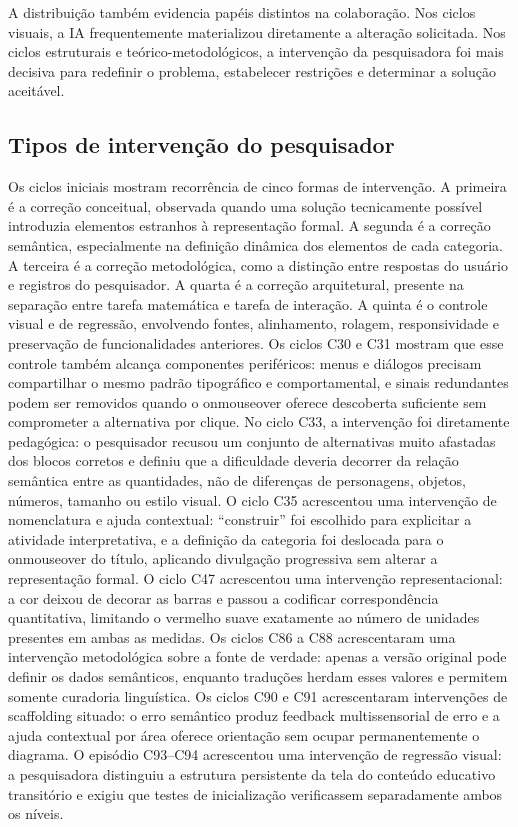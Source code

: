 \documentclass[preprint,12pt,authoryear]{elsarticle}
\begin{document}
A distribuição também evidencia papéis distintos na colaboração. Nos ciclos visuais, a IA frequentemente materializou diretamente a alteração solicitada. Nos ciclos estruturais e teórico-metodológicos, a intervenção da pesquisadora foi mais decisiva para redefinir o problema, estabelecer restrições e determinar a solução aceitável.

\subsection{Tipos de intervenção do pesquisador}
Os ciclos iniciais mostram recorrência de cinco formas de intervenção. A primeira é a correção conceitual, observada quando uma solução tecnicamente possível introduzia elementos estranhos à representação formal. A segunda é a correção semântica, especialmente na definição dinâmica dos elementos de cada categoria. A terceira é a correção metodológica, como a distinção entre respostas do usuário e registros do pesquisador. A quarta é a correção arquitetural, presente na separação entre tarefa matemática e tarefa de interação. A quinta é o controle visual e de regressão, envolvendo fontes, alinhamento, rolagem, responsividade e preservação de funcionalidades anteriores. Os ciclos C30 e C31 mostram que esse controle também alcança componentes periféricos: menus e diálogos precisam compartilhar o mesmo padrão tipográfico e comportamental, e sinais redundantes podem ser removidos quando o onmouseover oferece descoberta suficiente sem comprometer a alternativa por clique. No ciclo C33, a intervenção foi diretamente pedagógica: o pesquisador recusou um conjunto de alternativas muito afastadas dos blocos corretos e definiu que a dificuldade deveria decorrer da relação semântica entre as quantidades, não de diferenças de personagens, objetos, números, tamanho ou estilo visual. O ciclo C35 acrescentou uma intervenção de nomenclatura e ajuda contextual: ``construir'' foi escolhido para explicitar a atividade interpretativa, e a definição da categoria foi deslocada para o onmouseover do título, aplicando divulgação progressiva sem alterar a representação formal. O ciclo C47 acrescentou uma intervenção representacional: a cor deixou de decorar as barras e passou a codificar correspondência quantitativa, limitando o vermelho suave exatamente ao número de unidades presentes em ambas as medidas. Os ciclos C86 a C88 acrescentaram uma intervenção metodológica sobre a fonte de verdade: apenas a versão original pode definir os dados semânticos, enquanto traduções herdam esses valores e permitem somente curadoria linguística. Os ciclos C90 e C91 acrescentaram intervenções de scaffolding situado: o erro semântico produz feedback multissensorial de erro e a ajuda contextual por área oferece orientação sem ocupar permanentemente o diagrama. O episódio C93--C94 acrescentou uma intervenção de regressão visual: a pesquisadora distinguiu a estrutura persistente da tela do conteúdo educativo transitório e exigiu que testes de inicialização verificassem separadamente ambos os níveis.
\end{document}
